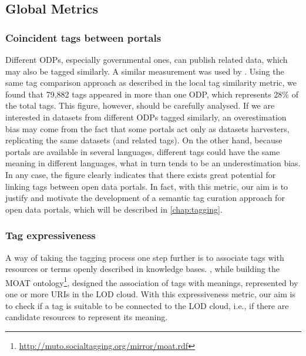 
\subsection{Global Metrics}
\label{sec:global_metrics}

\subsubsection{Coincident tags between portals}
Different ODPs, especially governmental ones, can publish related data, which may also be tagged similarly.
A similar measurement was used by .
Using the same tag comparison approach as described in the local tag similarity metric, we found that 79,882 tags appeared in more than one ODP, which represents 28\% of the total tags. 
This figure, however, should be carefully analysed. 
If we are interested in datasets from different ODPs tagged similarly, an overestimation bias may come from the fact that some portals act only as datasets harvesters, replicating the same datasets (and related tags). 
On the other hand, because portals are available in several languages, different tags could have the same meaning in different languages, what in turn tends to be an underestimation bias.
In any case, the figure clearly indicates that there exists great potential for linking tags between open data portals.
In fact, with this metric, our aim is to justify and motivate the development of a semantic tag curation approach for open data portals, which will be described in \autoref{chap:tagging}. 



\subsubsection{Tag expressiveness}
A way of taking the tagging process one step further is to associate tags with resources or terms openly described in knowledge bases.
, while building the MOAT ontology\footnote{\url{http://muto.socialtagging.org/mirror/moat.rdf}}, designed the association of tags with meanings, represented by one or more URIs in the LOD cloud.
With this expressiveness metric, our aim is to check if a tag is suitable to be connected to the LOD cloud, i.e., if there are candidate resources to represent its meaning.

